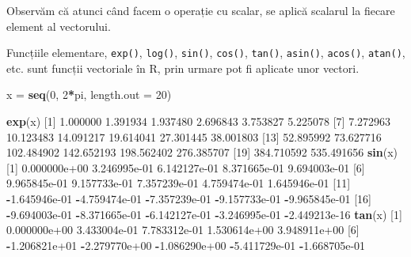 \documentclass[]{article}
\newenvironment{Shaded}{\begin{snugshade}}{\end{snugshade}}
\newcommand{\KeywordTok}[1]{\textcolor[rgb]{0.13,0.29,0.53}{\textbf{#1}}}
\newcommand{\DataTypeTok}[1]{\textcolor[rgb]{0.13,0.29,0.53}{#1}}
\newcommand{\DecValTok}[1]{\textcolor[rgb]{0.00,0.00,0.81}{#1}}
\newcommand{\FloatTok}[1]{\textcolor[rgb]{0.00,0.00,0.81}{#1}}
\newcommand{\StringTok}[1]{\textcolor[rgb]{0.31,0.60,0.02}{#1}}
\newcommand{\OperatorTok}[1]{\textcolor[rgb]{0.81,0.36,0.00}{\textbf{#1}}}
\newcommand{\NormalTok}[1]{#1}
\begin{document}
Observăm că atunci când facem o operație cu scalar, se aplică scalarul
la fiecare element al vectorului.

Funcțiile elementare, \texttt{exp()}, \texttt{log()}, \texttt{sin()},
\texttt{cos()}, \texttt{tan()}, \texttt{asin()}, \texttt{acos()},
\texttt{atan()}, etc. sunt funcții vectoriale în R, prin urmare pot fi
aplicate unor vectori.

\begin{Shaded}
\begin{Highlighting}[]
\NormalTok{x =}\StringTok{ }\KeywordTok{seq}\NormalTok{(}\DecValTok{0}\NormalTok{, }\DecValTok{2}\OperatorTok{*}\NormalTok{pi, }\DataTypeTok{length.out =} \DecValTok{20}\NormalTok{)}

\KeywordTok{exp}\NormalTok{(x)}
\NormalTok{ [}\DecValTok{1}\NormalTok{]   }\FloatTok{1.000000}   \FloatTok{1.391934}   \FloatTok{1.937480}   \FloatTok{2.696843}   \FloatTok{3.753827}   \FloatTok{5.225078}
\NormalTok{ [}\DecValTok{7}\NormalTok{]   }\FloatTok{7.272963}  \FloatTok{10.123483}  \FloatTok{14.091217}  \FloatTok{19.614041}  \FloatTok{27.301445}  \FloatTok{38.001803}
\NormalTok{[}\DecValTok{13}\NormalTok{]  }\FloatTok{52.895992}  \FloatTok{73.627716} \FloatTok{102.484902} \FloatTok{142.652193} \FloatTok{198.562402} \FloatTok{276.385707}
\NormalTok{[}\DecValTok{19}\NormalTok{] }\FloatTok{384.710592} \FloatTok{535.491656}
\KeywordTok{sin}\NormalTok{(x)}
\NormalTok{ [}\DecValTok{1}\NormalTok{]  }\FloatTok{0.000000e+00}  \FloatTok{3.246995e-01}  \FloatTok{6.142127e-01}  \FloatTok{8.371665e-01}  \FloatTok{9.694003e-01}
\NormalTok{ [}\DecValTok{6}\NormalTok{]  }\FloatTok{9.965845e-01}  \FloatTok{9.157733e-01}  \FloatTok{7.357239e-01}  \FloatTok{4.759474e-01}  \FloatTok{1.645946e-01}
\NormalTok{[}\DecValTok{11}\NormalTok{] }\OperatorTok{-}\FloatTok{1.645946e-01} \OperatorTok{-}\FloatTok{4.759474e-01} \OperatorTok{-}\FloatTok{7.357239e-01} \OperatorTok{-}\FloatTok{9.157733e-01} \OperatorTok{-}\FloatTok{9.965845e-01}
\NormalTok{[}\DecValTok{16}\NormalTok{] }\OperatorTok{-}\FloatTok{9.694003e-01} \OperatorTok{-}\FloatTok{8.371665e-01} \OperatorTok{-}\FloatTok{6.142127e-01} \OperatorTok{-}\FloatTok{3.246995e-01} \OperatorTok{-}\FloatTok{2.449213e-16}
\KeywordTok{tan}\NormalTok{(x)}
\NormalTok{ [}\DecValTok{1}\NormalTok{]  }\FloatTok{0.000000e+00}  \FloatTok{3.433004e-01}  \FloatTok{7.783312e-01}  \FloatTok{1.530614e+00}  \FloatTok{3.948911e+00}
\NormalTok{ [}\DecValTok{6}\NormalTok{] }\OperatorTok{-}\FloatTok{1.206821e+01} \OperatorTok{-}\FloatTok{2.279770e+00} \OperatorTok{-}\FloatTok{1.086290e+00} \OperatorTok{-}\FloatTok{5.411729e-01} \OperatorTok{-}\FloatTok{1.668705e-01}

\end{Highlighting}
\end{Shaded}
\end{document}
